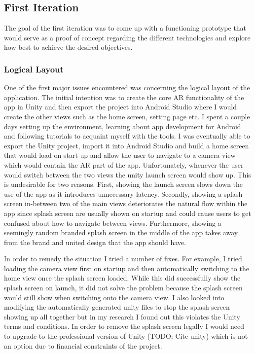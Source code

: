 \documentclass{l4proj}
\begin{document}
\subsection{First Iteration}
The goal of the first iteration was to come up with a functioning prototype that would serve as a proof of concept regarding the different technologies and explore how best to achieve the desired objectives. 

\subsubsection{Logical Layout}
One of the first major issues encountered was concerning the logical layout of the application. The initial intention was to create the core AR functionality of the app in Unity and then export the project into Android Studio where I would create the other views such as the home screen, setting page etc. I spent a couple days setting up the environment, learning about app development for Android and following tutorials to acquaint myself with the tools. I was eventually able to export the Unity project, import it into Android Studio and build a home screen that would load on start up and allow the user to navigate to a camera view which would contain the AR part of the app. Unfortunately, whenever the user would switch between the two views the unity launch screen would show up. This is undesirable for two reasons. First, showing the launch screen slows down the use of the app as it introduces unnecessary latency. Secondly, showing a splash screen in-between two of the main views deteriorates the natural flow within the app since splash screen are usually shown on startup and could cause users to get confused about how to navigate between views. Furthermore, showing a seemingly random branded splash screen in the middle of the app takes away from the brand and united design that the app should have. 

In order to remedy the situation I tried a number of fixes. For example, I tried loading the camera view first on startup and then automatically switching to the home view once the splash screen loaded. While this did successfully show the splash screen on launch, it did not solve the problem because the splash screen would still show when switching onto the camera view. I also looked into modifying the automatically generated unity files to stop the splash screen showing up all together but in my research I found out this violates the Unity terms and conditions. In order to remove the splash screen legally I would need to upgrade to the professional version of Unity (TODO: Cite unity) which is not an option due to financial constraints of the project.
\end{document}
